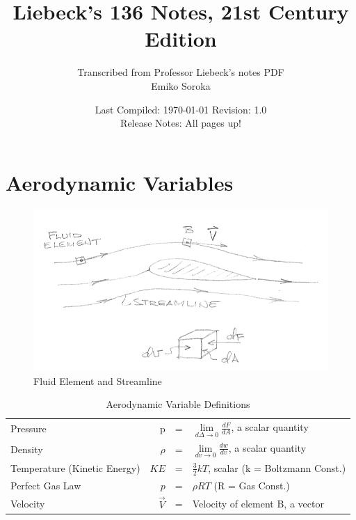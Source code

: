 \documentclass[draft=false, titlepage]{article}
\title{Liebeck's 136 Notes, 21st Century Edition}
\author{Transcribed from Professor Liebeck's notes PDF\\
\small Emiko Soroka}
\date{Last Compiled: \today\linebreak\linebreak
\small Revision: 1.0\\
Release Notes: All pages up!}
\begin{document}
\maketitle
\tableofcontents
\listoffigures
\listoftables
\pagebreak

\section{Aerodynamic Variables}
\begin{figure}[ht]
    \centering
    \includegraphics[width=0.7\linewidth]{Figures/pg1_1.png}
    \caption{Fluid Element and Streamline}
    \label{fig:pg1_1}
\end{figure}

\begin{table}[ht]
    \centering
    \renewcommand{\arraystretch}{1.5}
    \caption{Aerodynamic Variable Definitions}
    \begin{tabular}{l|rcl}
         Pressure & p &=& $\lim\limits_{d\Delta \to 0} \frac{dF}{dA}$, a scalar quantity\\
         Density & $\rho$ &=& $\lim\limits_{dv\to 0} \frac{dw}{dv}$, a scalar quantity\\
         Temperature (Kinetic Energy) & $KE$ &=& $\frac{3}{2}kT$, scalar (k = Boltzmann Const.)\\
         Perfect Gas Law & $p$ &=& $\rho RT$ (R = Gas Const.)\\
         Velocity & $\vec{V}$ &=& Velocity of element B, a vector\\
         
    \end{tabular}
    \label{tab:my_label}
\end{table}
\end{document}
